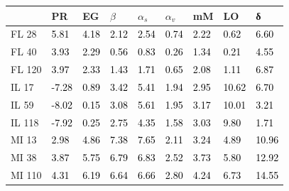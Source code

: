 \begin{tabular}{lllllllll}
\toprule
 & PR & EG & $β$ & $α_s$ & $α_v$ & mM & LO & δ \\
\midrule
FL 28 & \textcolor{black}{ 5.81 } & \textcolor{black}{ 4.18 } & \textcolor{black}{ 2.12 } & \textcolor{black}{ 2.54 } & \textcolor{black}{ 0.74 } & \textcolor{black}{ 2.22 } & \textcolor{black}{ 0.62 } & \textcolor{black}{ 6.60 } \\
FL 40 & \textcolor{black}{ 3.93 } & \textcolor{black}{ 2.29 } & \textcolor{black}{ 0.56 } & \textcolor{black}{ 0.83 } & \textcolor{black}{ 0.26 } & \textcolor{black}{ 1.34 } & \textcolor{black}{ 0.21 } & \textcolor{black}{ 4.55 } \\
FL 120 & \textcolor{black}{ 3.97 } & \textcolor{black}{ 2.33 } & \textcolor{black}{ 1.43 } & \textcolor{black}{ 1.71 } & \textcolor{black}{ 0.65 } & \textcolor{black}{ 2.08 } & \textcolor{black}{ 1.11 } & \textcolor{black}{ 6.87 } \\
IL 17 & \textcolor{black}{ -7.28 } & \textcolor{black}{ 0.89 } & \textcolor{black}{ 3.42 } & \textcolor{black}{ 5.41 } & \textcolor{black}{ 1.94 } & \textcolor{black}{ 2.95 } & \textcolor{black}{ 10.62 } & \textcolor{black}{ 6.70 } \\
IL 59 & \textcolor{black}{ -8.02 } & \textcolor{black}{ 0.15 } & \textcolor{black}{ 3.08 } & \textcolor{black}{ 5.61 } & \textcolor{black}{ 1.95 } & \textcolor{black}{ 3.17 } & \textcolor{black}{ 10.01 } & \textcolor{black}{ 3.21 } \\
IL 118 & \textcolor{black}{ -7.92 } & \textcolor{black}{ 0.25 } & \textcolor{black}{ 2.75 } & \textcolor{black}{ 4.35 } & \textcolor{black}{ 1.58 } & \textcolor{black}{ 3.03 } & \textcolor{black}{ 9.80 } & \textcolor{black}{ 1.71 } \\
MI 13 & \textcolor{black}{ 2.98 } & \textcolor{black}{ 4.86 } & \textcolor{black}{ 7.38 } & \textcolor{black}{ 7.65 } & \textcolor{black}{ 2.11 } & \textcolor{black}{ 3.24 } & \textcolor{black}{ 4.89 } & \textcolor{black}{ 10.96 } \\
MI 38 & \textcolor{black}{ 3.87 } & \textcolor{black}{ 5.75 } & \textcolor{black}{ 6.79 } & \textcolor{black}{ 6.83 } & \textcolor{black}{ 2.52 } & \textcolor{black}{ 3.73 } & \textcolor{black}{ 5.80 } & \textcolor{black}{ 12.92 } \\
MI 110 & \textcolor{black}{ 4.31 } & \textcolor{black}{ 6.19 } & \textcolor{black}{ 6.64 } & \textcolor{black}{ 6.66 } & \textcolor{black}{ 2.80 } & \textcolor{black}{ 4.24 } & \textcolor{black}{ 6.73 } & \textcolor{black}{ 14.55 } \\

\end{tabular}
